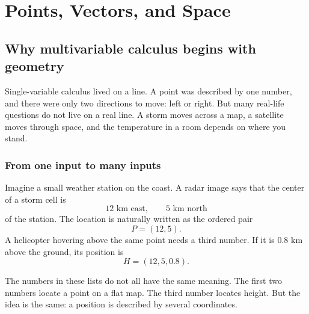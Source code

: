 
\chapter{Points, Vectors, and Space}
\label{ch:1}

\section{Why multivariable calculus begins with geometry}

Single-variable calculus lived on a line.  A point was described by one number, and
there were only two directions to move: left or right. But many real-life questions do not
live on a real line.  A storm moves across a map, a satellite moves through space, and
the temperature in a room depends on where you stand.

\subsection{From one input to many inputs}

Imagine a small weather station on the coast.  A radar image says that the center of
a storm cell is
\[
    12 \text{ km east}, \qquad 5 \text{ km north}
\]
of the station. The location is naturally written as the
ordered pair
\[
    P=(12,5).
\]
A helicopter hovering above the same point needs a third number.  If it is
\(0.8\) km above the ground, its position is
\[
    H=(12,5,0.8).
\]

The numbers in these lists do not all have the same meaning.  The first two numbers
locate a point on a flat map.  The third number locates height.  But the idea is the
same: a position is described by several coordinates.

